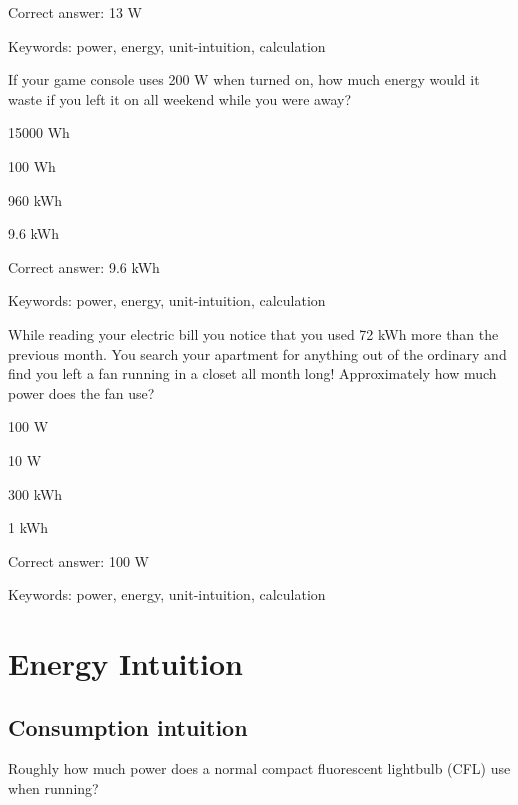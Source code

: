 Correct answer: 13 W

Keywords: power, energy, unit-intuition, calculation

\begin{question}
	\item If your game console uses 200 W when turned on, how much energy would it waste if you left it on all weekend while you were away?
\end{question}

\begin{answer}
	\item 15000 Wh
	\item 100 Wh
	\item 960 kWh
	\item 9.6 kWh
\end{answer}

Correct answer: 9.6 kWh

Keywords: power, energy, unit-intuition, calculation

\begin{question}
	\item While reading your electric bill you notice that you used 72 kWh more than the previous month. You search your apartment for anything out of the ordinary and find you left a fan running in a closet all month long! Approximately how much power does the fan use?
\end{question}

\begin{answer}
	\item 100 W
	\item 10 W
	\item 300 kWh
	\item 1 kWh
\end{answer}

Correct answer: 100 W

Keywords: power, energy, unit-intuition, calculation


\section{Energy Intuition}

\subsection{Consumption intuition}

\begin{question}
	\item Roughly how much power does a normal compact fluorescent lightbulb (CFL) use when running?
\end{question}

